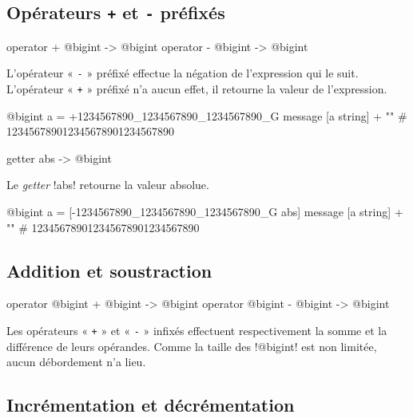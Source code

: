 \subsection{Opérateurs \texttt{+} et \texttt{-} préfixés}

\begin{galgas4box}
operator + @bigint -> @bigint
operator - @bigint -> @bigint
\end{galgas4box}

L'opérateur « \texttt{-} » préfixé effectue la négation de l'expression qui le suit. L'opérateur « \texttt{+} » préfixé n'a aucun effet, il retourne la valeur de l'expression.

\begin{galgas4}
@bigint a = +1234567890_1234567890_1234567890_G
message [a string] + "\n" # 123456789012345678901234567890
\end{galgas4}










\begin{galgas4box}
getter abs -> @bigint
\end{galgas4box}

Le \emph{getter} \ggsq!abs! retourne la valeur absolue.

\begin{galgas4}
@bigint a = [-1234567890_1234567890_1234567890_G abs]
message [a string] + "\n" # 123456789012345678901234567890
\end{galgas4}






\subsection{Addition et soustraction}

\begin{galgas4box}
operator @bigint + @bigint -> @bigint
operator @bigint - @bigint -> @bigint
\end{galgas4box}

Les opérateurs « \texttt{+} » et « \texttt{-} » infixés effectuent respectivement la somme et la différence de leurs opérandes. Comme la taille des \ggsq!@bigint! est non limitée, aucun débordement n'a lieu.


\subsection{Incrémentation et décrémentation}

